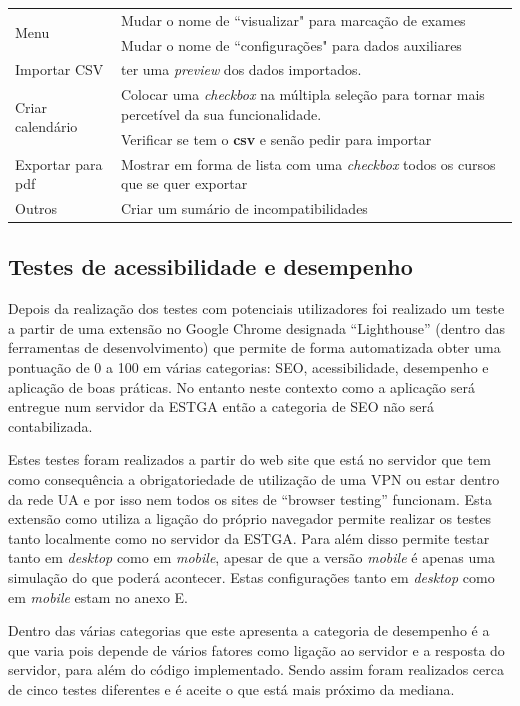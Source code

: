 \documentclass[11pt, twoside]{report}
\begin{document}
\begin{center}
\begin{longtable}{|m{2.2cm}|m{12cm}|}
			\hline
			
			\multirow{2}{2cm}{Menu} &Mudar o nome de ``visualizar" para marcação de exames\\
			&Mudar o nome de ``configurações" para dados auxiliares\\
			\hline
			Importar CSV & ter uma \textit{preview} dos dados importados.\\
			\hline
			\multirow{2}{2cm}{Criar calendário} & Colocar uma \textit{checkbox} na múltipla seleção para tornar mais percetível da sua funcionalidade.\\
			& Verificar se tem o \textbf{csv} e senão pedir para importar\\
			\hline
			Exportar para pdf & Mostrar em forma de lista com uma \textit{checkbox} todos os cursos que se quer exportar\\
			\hline
			Outros & Criar um sumário de incompatibilidades\\
			\hline
		\end{longtable}
	\end{center}
	
	\subsection{Testes de acessibilidade e desempenho}
	
	Depois da realização dos testes com potenciais utilizadores foi realizado um teste a partir de uma extensão no Google Chrome designada ``Lighthouse'' (dentro das ferramentas de desenvolvimento) que permite de forma automatizada obter uma pontuação de 0 a 100 em várias categorias: SEO, acessibilidade, desempenho e aplicação de boas práticas.
	No entanto neste contexto como a aplicação será entregue num servidor da ESTGA então a categoria de SEO não será contabilizada. 
	
	Estes testes foram realizados a partir do web site que está no servidor que tem como consequência a obrigatoriedade de utilização de uma VPN ou estar dentro da rede UA e por isso nem todos os sites de ``browser testing'' funcionam.
	Esta extensão como utiliza a ligação do próprio navegador permite realizar os testes tanto localmente como no servidor da ESTGA.
	Para além disso permite testar tanto em \textit{desktop} como em \textit{mobile}, apesar de que a versão \textit{mobile} é apenas uma simulação do que poderá acontecer. Estas configurações tanto em \textit{desktop} como em \textit{mobile} estam no anexo E. 
	
	Dentro das várias categorias que este apresenta a categoria de desempenho é a que varia pois depende de vários fatores como ligação ao servidor e a resposta do servidor, para além do código implementado. Sendo assim foram realizados cerca de cinco testes diferentes e é aceite o que está mais próximo da mediana. 
	
\end{document}
